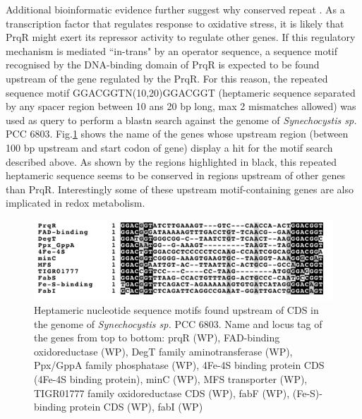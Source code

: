Additional bioinformatic evidence further suggest why conserved repeat . As a transcription factor that regulates response to oxidative stress, it is likely that PrqR might exert its repressor activity to regulate other genes. If this regulatory mechanism is mediated ``in-trans" by an operator sequence, a sequence motif recognised by the DNA-binding domain of PrqR is expected to be found upstream of the gene regulated by the PrqR.
For this reason, the repeated sequence motif GGACGGTN(10,20)GGACGGT (heptameric sequence separated by any spacer region between 10 ans 20 bp long, max 2 mismatches allowed) was used as query to perform a blastn search against the genome of \textit{Synechocystis sp.} PCC 6803.
Fig.\ref{fig:motifs} shows the name of the genes whose upstream region (between 100 bp upstream and start codon of gene) display a hit for the motif search described above.
As shown by the regions highlighted in black, this repeated heptameric sequence seems to be conserved in regions upstream of other genes than PrqR. Interestingly some of these upstream motif-containing genes are also implicated in redox metabolism.
\begin{figure}[H]
    \centering
    \includegraphics[width=\textwidth]{images/prqR_motif.png}
    \caption{Heptameric nucleotide sequence motifs found upstream of CDS in the genome of \textit{Synechocystis sp.} PCC 6803. Name and locus tag of the genes from top to bottom: prqR (WP), FAD-binding oxidoreductase (WP), DegT family aminotransferase (WP),  Ppx/GppA family phosphatase (WP), 4Fe-4S binding protein CDS (4Fe-4S binding protein), minC (WP), MFS transporter (WP), TIGR01777 family oxidoreductase CDS (WP), fabF (WP), (Fe-S)-binding protein CDS (WP), fabI (WP)}
    \label{fig:motifs}
\end{figure}


